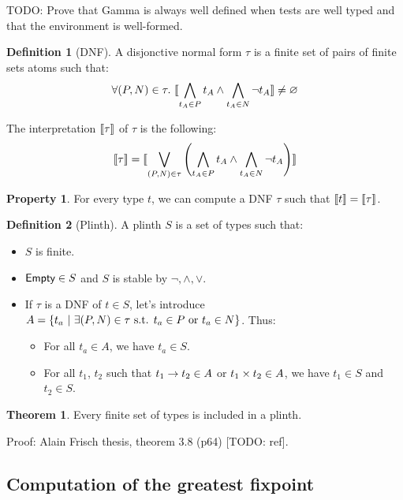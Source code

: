 \documentclass[a4paper]{article}
\theoremstyle{definition}
\newtheorem{theorem}{Theorem}
\newtheorem{definition}{Definition}
\newtheorem{property}{Property}
\begin{document}
    TODO: Prove that Gamma is always well defined when tests are well typed and that the environment is well-formed.

    \begin{definition}[DNF]
      A disjonctive normal form $\tau$ is a finite set of pairs of finite sets atoms such that:
      \[ \forall (P,N)\in \tau.\ {\llbracket \bigwedge_{t_A \in P} t_A \land \bigwedge_{t_A \in N} \neg t_A \rrbracket} \neq \varnothing \]

      The interpretation ${\llbracket \tau \rrbracket}$ of $\tau$ is the following:
      \[
        {\llbracket \tau \rrbracket} = {\llbracket \bigvee_{(P,N)\in \tau} \left(\bigwedge_{t_A \in P} t_A \land \bigwedge_{t_A \in N} \neg t_A \right) \rrbracket}
      \]
    \end{definition}

    \begin{property}
      For every type $t$, we can compute a DNF $\tau$ such that ${\llbracket t \rrbracket} = {\llbracket \tau \rrbracket}$.
    \end{property}

    \begin{definition}[Plinth]
      A plinth $S$ is a set of types such that:
      \begin{itemize}
        \item $S$ is finite.
        \item $\textsf{Empty} \in S$ and $S$ is stable by $\neg, \land, \vee$. 
        \item If $\tau$ is a DNF of $t\in S$, let's introduce $A=\{t_a ~|~ \exists (P,N) \in \tau \text{ s.t. } t_a \in P \text{ or } t_a \in N \}$. Thus:
        \begin{itemize}
          \item For all $t_a \in A$, we have $t_a \in S$.
          \item For all $t_1$, $t_2$ such that $t_1\to t_2 \in A$ or $t_1\times t_2 \in A$,
          we have $t_1 \in S$ and $t_2 \in S$.
        \end{itemize}
      \end{itemize}
    \end{definition}

    \begin{theorem}
      Every finite set of types is included in a plinth.
    \end{theorem}

    Proof: Alain Frisch thesis, theorem 3.8 (p64) [TODO: ref].

    \subsection{Computation of the greatest fixpoint}
\end{document}
